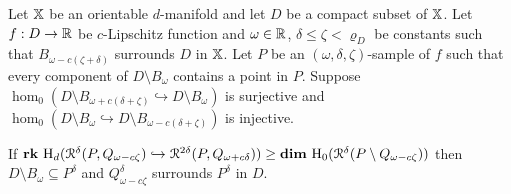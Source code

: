\begin{theorem}\label{thm:algo_tcc}
  Let $\mathbb{X}$ be an orientable $d$-manifold and let $D$ be a compact subset of $\mathbb{X}$.
  Let $f : D\to\mathbb{R}$ be $c$-Lipschitz function and $\omega\in\mathbb{R}$, $\delta\leq\zeta < \varrho_D$ be constants such that $B_{\omega - c(\zeta +\delta)}$ surrounds $D$ in $\mathbb{X}$.
  Let $P$ be an $(\omega, \delta,\zeta)$-sample of $f$ such that every component of $D\setminus B_\omega$ contains a point in $P$.
  Suppose $\hom_0(D\setminus B_{\omega+c(\delta+\zeta)}\hookrightarrow D\setminus B_\omega)$ is surjective and $\hom_0(D\setminus B_\omega\hookrightarrow D\setminus B_{\omega-c(\delta+\zeta)})$ is injective.

   If $\mathbf{rk}~\mathrm{H}_d(\mathcal{R}^\delta(P, Q_{\omega -c\zeta})\hookrightarrow \mathcal{R}^{2\delta}(P, Q_{\omega+c\delta})) \geq \mathbf{dim}~\mathrm{H}_0(\mathcal{R}^\delta(P\setminus Q_{\omega-c\zeta}))$ then $D\setminus B_\omega\subseteq P^\delta$ and $Q_{\omega-c\zeta}^\delta$ surrounds $P^\delta$ in $D$.
\end{theorem}
